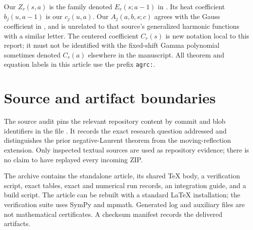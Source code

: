 \documentclass[11pt]{article}
\numberwithin{equation}{section}
\theoremstyle{definition}\newtheorem{definition}[theorem]{Definition}
\theoremstyle{remark}\newtheorem{remark}[theorem]{Remark}
\begin{document}
Our $Z_r(s,a)$ is the family denoted $E_r(s;a-1)$ in
\cite{repo-laurent}. Its heat coefficient $b_j(u,a-1)$ is our
$c_j(u,a)$. Our $A_j(a,b,s;c)$ agrees with the Gauss coefficient in
\cite{repo-gauss}, and is unrelated to that source's generalized harmonic
functions with a similar letter. The centered coefficient $C_r(s)$ is
new notation local to this report; it must not be identified with the
fixed-shift Gamma polynomial sometimes denoted $C_r(a)$ elsewhere in
the manuscript. All theorem and equation labels in this article use
the prefix \texttt{agrc:}.

\section{Source and artifact boundaries}

The source audit pins the relevant repository content by commit and blob
identifiers in the file . It records the exact
research question addressed and distinguishes the prior negative-Laurent
 theorem from the moving-reflection extension. Only inspected textual
sources are used as repository evidence; there is no claim to have
replayed every incoming ZIP.

The archive contains the standalone article, its shared TeX body, a
verification script, exact tables, exact and numerical run records,
an integration guide, and a build script. The article can be rebuilt
with a standard LaTeX installation; the verification suite uses SymPy
and mpmath. Generated log and auxiliary files are not mathematical
certificates. A checksum manifest records the delivered artifacts.
\end{document}

